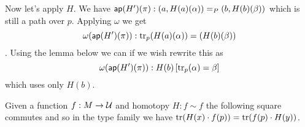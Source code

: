 Now let's apply \( H \). We have \( \mathsf{ap}(H')(\pi):(a,H(a)(\alpha))=_P(b,H(b)(\beta)) \) which is still a path over \( p \). Applying \( \omega \) we get \[ \omega(\mathsf{ap}(H')(\pi)):\mathrm{tr}_p(H(a)(\alpha))=(H(b)(\beta)) \]. Using the lemma below we can if we wish rewrite this as 
\[ 
\omega(\mathsf{ap}(H')(\pi)):H(b)\left[\mathrm{tr}_p(\alpha)=\beta\right]
\]
which uses only \( H(b) \).

\begin{mylemma}
Given a function \( f:M\to\mathcal{U} \) and homotopy \( H:f\sim f \) the following square commutes and so in the type family we have \( \mathrm{tr}(H(x)\cdot f(p)) = \mathrm{tr}(f(p)\cdot H(y)) \).
\end{mylemma}
\begin{center}
\end{center}


